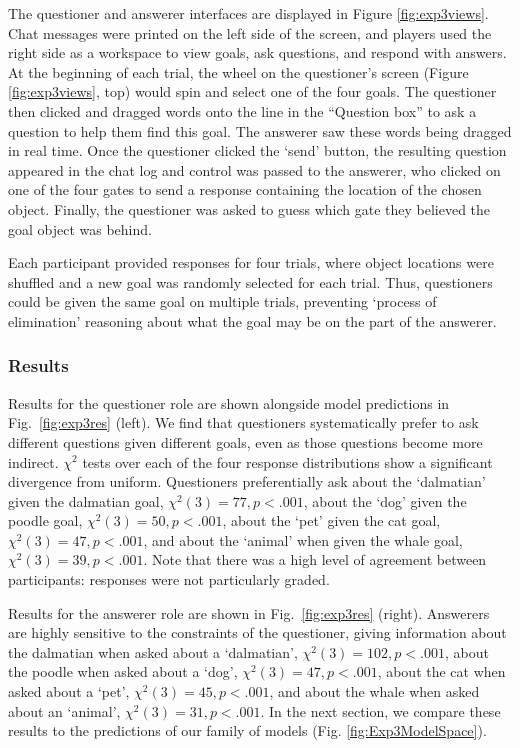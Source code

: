 \documentclass[12pt, floatsintext, jou]{apa6}
\begin{document}
The questioner and answerer interfaces are displayed in Figure \ref{fig:exp3views}. Chat messages were printed on the left side of the screen, and players used the right side as a workspace to view goals, ask questions, and respond with answers. At the beginning of each trial, the wheel on the questioner's screen (Figure \ref{fig:exp3views}, top) would spin and select one of the four goals. The questioner then clicked and dragged words onto the line in the ``Question box'' to ask a question to help them find this goal. The answerer saw these words being dragged in real time. Once the questioner clicked the `send' button, the resulting question appeared in the chat log and control was passed to the answerer, who clicked on one of the four gates to send a response containing the location of the chosen object. Finally, the questioner was asked to guess which gate they believed the goal object was behind. 

Each participant provided responses for four trials, where object locations were shuffled and a new goal was randomly selected for each trial. Thus, questioners could be given the same goal on multiple trials, preventing `process of elimination' reasoning about what the goal may be on the part of the answerer. 

\subsubsection{Results}
Results for the questioner role are shown alongside model predictions in Fig.~\ref{fig:exp3res} (left). We find that questioners systematically prefer to ask different questions given different goals, even as those questions become more indirect. $\chi^2$ tests over each of the four response distributions show a significant divergence from uniform. Questioners preferentially ask about the `dalmatian' given the  dalmatian goal, ${\chi^2(3) = 77}, {p < .001}$, about the `dog' given the poodle goal, ${\chi^2(3) = 50}, {p <.001}$, about the `pet' given the cat goal, ${\chi^2(3) = 47},  {p <.001}$, and about the `animal' when given the whale goal, ${\chi^2(3) = 39}, {p <.001}$. Note that there was a high level of agreement between participants: responses were not particularly graded.

Results for the answerer role are shown in Fig.~\ref{fig:exp3res} (right). Answerers are highly sensitive to the constraints of the questioner, giving information about the dalmatian when asked about a `dalmatian', ${\chi^2(3) = 102}, {p <.001}$, about the poodle when asked about a `dog', ${\chi^2(3) = 47}, {p <.001}$, about the cat when asked about a `pet', ${\chi^2(3) = 45}, {p<.001}$, and about the whale when asked about an `animal', ${\chi^2(3) = 31}, {p < .001}$. In the next section, we compare these results to the predictions of our family of models (Fig. \ref{fig:Exp3ModelSpace}). 
\end{document}
